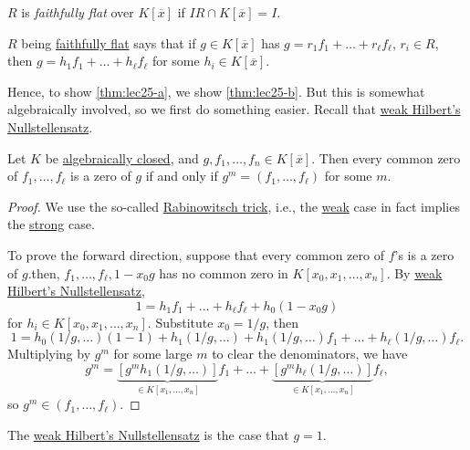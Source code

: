 \begin{notation}\label{not:faithfully-flat}
	\(R\) is \emph{faithfully flat} over \(K[\overline{x} ]\) if \(IR \cap K[\overline{x} ] = I\).
\end{notation}

\begin{intuition}
	\(R\) being \hyperref[not:faithfully-flat]{faithfully flat} says that if \(g\in K[\overline{x} ]\) has \(g = r_1 f_1 + \dots + r_{\ell } f_{\ell } \), \(r_i\in R\), then \(g = h_1 f_1 + \dots + h_{\ell } f_{\ell }  \) for some \(h_i \in K[\overline{x} ]\).
\end{intuition}

Hence, to show \autoref{thm:lec25-a}, we show \autoref{thm:lec25-b}. But this is somewhat algebraically involved, so we first do something easier. Recall that \hyperref[thm:weak-Hilbert-Nullstellensatz]{weak Hilbert's Nullstellensatz}.

\begin{theorem}\label{thm:strong-Hilbert-Nullstellensatz}
	Let \(K\) be \hyperref[def:algebraically-closed]{algebraically closed}, and \(g, f_1, \dots , f_n\in K[\overline{x} ]\). Then every common zero of \(f_1, \dots , f_{\ell } \) is a zero of \(g\) if and only if \(g^m = (f_1, \dots , f_{\ell } )\) for some \(m\).
\end{theorem}
\begin{proof}
	We use the so-called \href{https://en.wikipedia.org/wiki/Rabinowitsch_trick}{Rabinowitsch trick}, i.e., the \hyperref[thm:weak-Hilbert-Nullstellensatz]{weak} case in fact implies the \hyperref[thm:strong-Hilbert-Nullstellensatz]{strong} case.

	To prove the forward direction, suppose that every common zero of \(f\)'s is a zero of \(g\).then, \(f_1, \dots , f_{\ell }, 1 - x_0 g \) has no common zero in \(K[x_0, x_1, \dots , x_n]\). By \hyperref[thm:weak-Hilbert-Nullstellensatz]{weak Hilbert's Nullstellensatz},
	\[
		1 = h_1 f_1 + \dots + h_{\ell } f_{\ell } + h_0 (1 - x_0 g)
	\]
	for \(h_i \in K[x_0, x_1, \dots , x_n]\). Substitute \(x_0 = 1 / g\), then
	\[
		1 = h_0(1 / g, \dots ) (1 - 1) + h_1 ( 1/g, \dots ) + h_1(1 / g, \dots )f_1 + \dots + h_{\ell } (1 / g, \dots ) f_{\ell }.
	\]
	Multiplying by \(g^m\) for some large \(m\) to clear the denominators, we have
	\[
		g^m = \underbrace{[g^m h_1(1 / g, \dots )]}_{\in K[x_1, \dots , x_n]} f_1 + \dots + \underbrace{[g^m h_{\ell } (1 / g, \dots )]}_{\in K[x_1, \dots , x_n]}f_{\ell },
	\]
	so \(g^m\in (f_1, \dots ,f_{\ell } )\).
\end{proof}

\begin{note}
	The \hyperref[thm:weak-Hilbert-Nullstellensatz]{weak Hilbert's Nullstellensatz} is the case that \(g = 1\).
\end{note}